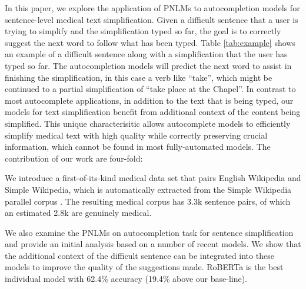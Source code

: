 \documentclass[11pt]{article}
\begin{document}
In this paper, we explore the application of PNLMs to autocompletion models for sentence-level medical text simplification. Given a difficult sentence that a user is trying to simplify and the simplification typed so far, the goal is to correctly suggest the next word to follow what has been typed. Table \ref{tab:example} shows an example of a difficult sentence along with a simplification that the user has typed so far. The autocompletion models will predict the next word to assist in finishing the simplification, in this case a verb like ``take'', which might be continued to a partial simplification of ``take place at the Chapel''. In contrast to most autocomplete applications, in addition to the text that is being typed, our models for text  simplification benefit from additional context of the content being simplified. This unique characterisitic allows autocomplete models to efficiently simplify medical text with high quality while correctly preserving crucial information, which cannot be found in most fully-automated models. The contribution of our work are four-fold:

\begin{table}
    \centering
    \caption{An example text simplification autocompletion task.  The user is simplifying the difficult sentence on top and has typed the words on the bottom so far.}
    \label{tab:example}
\end{table}

 We introduce a first-of-its-kind medical data set that pairs English Wikipedia and Simple Wikipedia, which is automatically extracted from the Simple Wikipedia parallel corpus \cite{kauchak2013improving}. The resulting medical corpus has 3.3k sentence pairs, of which an estimated 2.8k are genuinely medical.

 We also examine the PNLMs on autocompletion task for sentence simplification and provide an initial analysis based on a number of recent models. We show that the additional context of the difficult sentence can be integrated into these models to improve the quality of the suggestions made.  RoBERTa is the best individual model with 62.4\% accuracy (19.4\% above our base-line).
\end{document}
